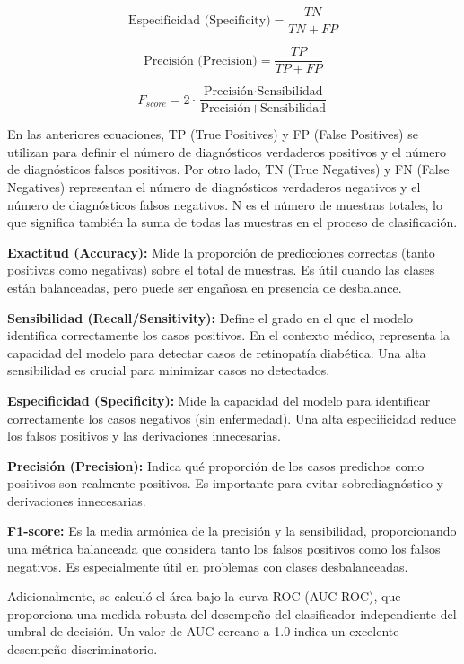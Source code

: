 \begin{equation}
	\text{Especificidad (Specificity)} = \frac{TN}{TN + FP}
\end{equation}

\begin{equation}
	\text{Precisión (Precision)} = \frac{TP}{TP + FP}
\end{equation}

\begin{equation}
	F_{score} = 2 \cdot \frac{\text{Precisión} \cdot \text{Sensibilidad}}{\text{Precisión} + \text{Sensibilidad}}
\end{equation}

En las anteriores ecuaciones, TP (True Positives) y FP (False Positives) se utilizan para definir el número de diagnósticos verdaderos positivos y el número de diagnósticos falsos positivos. Por otro lado, TN (True Negatives) y FN (False Negatives) representan el número de diagnósticos verdaderos negativos y el número de diagnósticos falsos negativos. N es el número de muestras totales, lo que significa también la suma de todas las muestras en el proceso de clasificación.

\textbf{Exactitud (Accuracy):} Mide la proporción de predicciones correctas (tanto positivas como negativas) sobre el total de muestras. Es útil cuando las clases están balanceadas, pero puede ser engañosa en presencia de desbalance.

\textbf{Sensibilidad (Recall/Sensitivity):} Define el grado en el que el modelo identifica correctamente los casos positivos. En el contexto médico, representa la capacidad del modelo para detectar casos de retinopatía diabética. Una alta sensibilidad es crucial para minimizar casos no detectados.

\textbf{Especificidad (Specificity):} Mide la capacidad del modelo para identificar correctamente los casos negativos (sin enfermedad). Una alta especificidad reduce los falsos positivos y las derivaciones innecesarias.

\textbf{Precisión (Precision):} Indica qué proporción de los casos predichos como positivos son realmente positivos. Es importante para evitar sobrediagnóstico y derivaciones innecesarias.

\textbf{F1-score:} Es la media armónica de la precisión y la sensibilidad, proporcionando una métrica balanceada que considera tanto los falsos positivos como los falsos negativos. Es especialmente útil en problemas con clases desbalanceadas.

Adicionalmente, se calculó el área bajo la curva ROC (AUC-ROC), que proporciona una medida robusta del desempeño del clasificador independiente del umbral de decisión. Un valor de AUC cercano a 1.0 indica un excelente desempeño discriminatorio.

